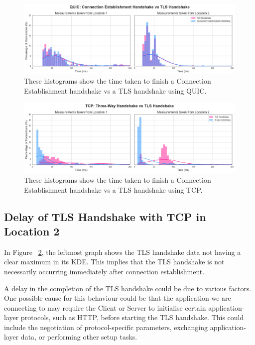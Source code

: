 \documentclass{l4proj}
\begin{document}
\begin{figure}
    \centering
    \includegraphics[width=1\linewidth]{images/transport_security_handshakes_QUIC.png}
    \caption{These histograms show the time taken to finish a Connection Establishment handshake vs a TLS handshake using QUIC.}
    \label{fig:CEvsTLS_QUIC}
\end{figure}


\begin{figure}
    \centering
    \includegraphics[width=1\linewidth]{images/transport_security_handshakes_TCP.png}
    \caption{These histograms show the time taken to finish a Connection Establishment handshake vs a TLS handshake using TCP.}
    \label{fig:CEvsTLS_TCP}
\end{figure}

\subsection{Delay of TLS Handshake with TCP in Location 2}

In Figure ~\ref{fig:CEvsTLS_TCP}, the leftmost graph shows the TLS handshake data not having a clear maximum in its KDE. This implies that the TLS handshake is not necessarily occurring immediately after connection establishment. 

A delay in the completion of the TLS handshake could be due to various factors. One possible cause for this behaviour could be that the application we are connecting to may require the Client or Server to initialise certain application-layer protocols, such as HTTP, before starting the TLS handshake. This could include the negotiation of protocol-specific parameters, exchanging application-layer data, or performing other setup tasks. 
\end{document}

